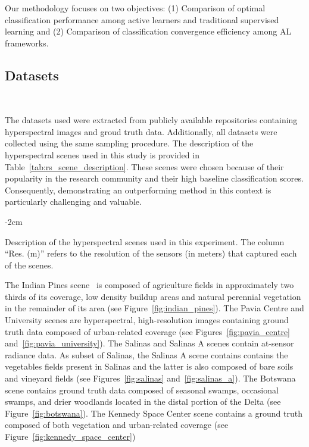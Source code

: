 \documentclass[preprint,12pt]{elsarticle}
\begin{document}
Our methodology focuses on two objectives: (1) Comparison of optimal
classification performance among active learners and traditional supervised
learning and (2) Comparison of classification convergence efficiency among AL
frameworks.

\subsection{Datasets}~\label{sec:datasets}

The datasets used were extracted from publicly available repositories
containing hyperspectral images and groud truth data. Additionally, all
datasets were collected using the same sampling procedure. The description of
the hyperspectral scenes used in this study is provided in
Table~\ref{tab:rs_scene_description}. These scenes were chosen because of
their popularity in the research community and their high baseline
classification scores. Consequently, demonstrating an outperforming method in
this context is particularly challenging and valuable.

\begin{table}[bp]
    \centering
    \addtolength{\leftskip} {-2cm}
    \addtolength{\rightskip}{-2cm}
    \caption{\label{tab:rs_scene_description}
        Description of the hyperspectral scenes used in this experiment. The
        column ``Res. (m)'' refers to the resolution of the sensors (in
        meters) that captured each of the scenes.}
\end{table}

The Indian Pines scene~\cite{Baumgardner2015} is composed of agriculture fields
in approximately two thirds of its coverage, low density buildup areas and
natural perennial vegetation in the remainder of its area (see
Figure~\ref{fig:indian_pines}). The Pavia Centre and University scenes are
hyperspectral, high-resolution images containing ground truth data composed of
urban-related coverage (see Figures~\ref{fig:pavia_centre}
and~\ref{fig:pavia_university}). The Salinas and Salinas A scenes contain
at-sensor radiance data. As subset of Salinas, the Salinas A scene contains
contains the vegetables fields present in Salinas and the latter is also
composed of bare soils and vineyard fields (see Figures~\ref{fig:salinas}
and~\ref{fig:salinas_a}). The Botswana scene contains ground truth data
composed of seasonal swamps, occasional swamps, and drier woodlands located in
the distal portion of the Delta (see Figure~\ref{fig:botswana}). The Kennedy
Space Center scene contains a ground truth composed of both vegetation and
urban-related coverage (see Figure~\ref{fig:kennedy_space_center})
\end{document}
